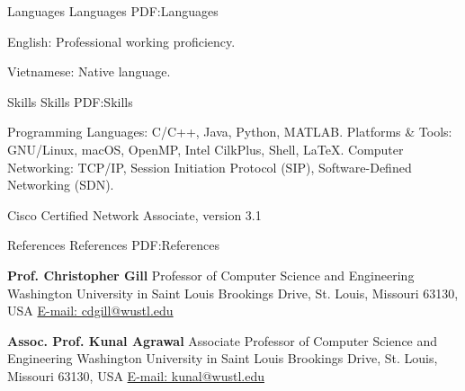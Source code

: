 \documentclass[letterpaper,MMMyyyy,nonstopmode]{simpleresumecv}
\begin{document}
\begin{Body}

\Section
{Languages}
{Languages}
{PDF:Languages}

\BulletItem
English: Professional working proficiency.

\Gap
\BulletItem
Vietnamese: Native language.



\Section
{Skills}
{Skills}
{PDF:Skills}

\Entry
\BulletItem
Programming Languages: C/C++, Java, Python, MATLAB.
\BulletItem
Platforms \& Tools: GNU/Linux, macOS, OpenMP, Intel CilkPlus, Shell, {\LaTeX}.
\BulletItem
Computer Networking: TCP/IP, Session Initiation Protocol (SIP), 
Software-Defined Networking (SDN).




\Entry
\BulletItem Cisco Certified Network Associate, version 3.1
\hfill {}






\Section
{References}
{References}
{PDF:References}

\BulletItem
\textbf{Prof. Christopher Gill}
\newline
Professor of Computer Science and Engineering
\newline
Washington University in Saint Louis
 Brookings Drive, St. Louis, Missouri 63130, USA
\newline
\href{mailto:cdgill@wustl.edu}
{E-mail: cdgill@wustl.edu}

\BigGap
\BulletItem
\textbf{Assoc. Prof. Kunal Agrawal}
\newline
Associate Professor of Computer Science and Engineering
\newline
Washington University in Saint Louis
 Brookings Drive, St. Louis, Missouri 63130, USA
\newline
\href{mailto:kunal@wustl.edu}
{E-mail: kunal@wustl.edu}


\end{Body}
\end{document}
